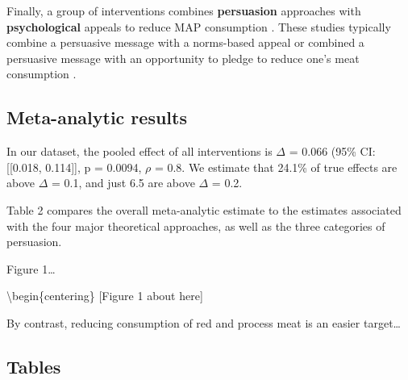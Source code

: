 \documentclass[sn-nature,referee,pdflatex]{sn-jnl}
\begin{document}
\begin{comment}
The first psychology study meeting our inclusion criteria was published in 2017.
\end{comment}

Finally, a group of interventions combines \textbf{persuasion}
approaches with \textbf{psychological} appeals to reduce MAP consumption
\citep{berndsen2005, bertolaso2015, carfora2023, fehrenbach2015, hennessy2016, mathur2021effectiveness, mattson2020, piester2020, shreedhar2021}.
These studies typically combine a persuasive message with a norms-based
appeal \citep{piester2020, mattson2020} or combined a persuasive message
with an opportunity to pledge to reduce one's meat consumption
\citep{mathur2021effectiveness, shreedhar2021}.

\subsection{Meta-analytic results}\label{meta-analytic-results}

In our dataset, the pooled effect of all interventions is \(\Delta\) =
0.066 (95\% CI: {[}{[}0.018, 0.114{]}{]}, p = 0.0094, \(\rho\) = 0.8. We
estimate that 24.1\% of true effects are above \(\Delta\) = 0.1, and
just 6.5 are above \(\Delta\) = 0.2.

Table 2 compares the overall meta-analytic estimate to the estimates
associated with the four major theoretical approaches, as well as the
three categories of persuasion.

\begin{centering}
\end{centering}

Figure 1\ldots{}

\textbackslash begin\{centering\} {[}Figure 1 about here{]}

By contrast, reducing consumption of red and process meat is an easier
target\ldots{}

\subsection{Tables}\label{tables}
\end{document}
